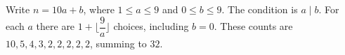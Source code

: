 Write $n=10a+b$, where $1\le a\le9$ and $0\le b\le9$. The condition is $a\mid b$. For each $a$ there are $1+\lfloor\dfrac{9}{a}\rfloor$ choices, including $b=0$. These counts are $10,5,4,3,2,2,2,2,2$, summing to $\boxed{32}$.
